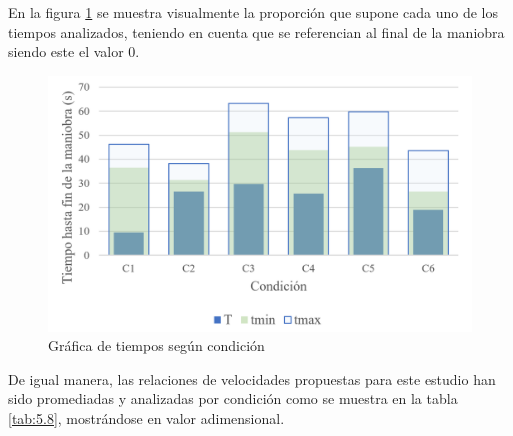 En la figura \ref{fig:5.9} se muestra visualmente la proporción que supone cada uno de los tiempos analizados, teniendo en cuenta que se referencian al final de la maniobra siendo este el valor 0.

\begin{figure}[h]
    \centering
    \includegraphics[width=12cm]
    {figures/5.9.png}
    \caption{ \label{fig:5.9} Gráfica de tiempos según condición }
\end{figure}

\newpage
De igual manera, las relaciones de velocidades propuestas para este estudio han sido promediadas y analizadas por condición como se muestra en la tabla \ref{tab:5.8}, mostrándose en valor adimensional. 

